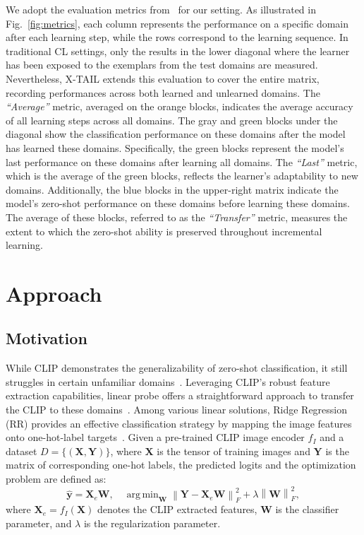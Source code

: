 \documentclass{article}
\DeclareMathOperator*{\argmin}{arg\,min}
\begin{document}
We adopt the evaluation metrics from~\cite{Zheng_2023_ICCV} for our setting. 
As illustrated in Fig.~\ref{fig:metrics}, each column represents the performance on a specific domain after each learning step, while the rows correspond to the learning sequence. 
In traditional CL settings, only the results in the lower diagonal where the learner has been exposed to the exemplars from the test domains are measured. Nevertheless, X-TAIL extends this evaluation to cover the entire matrix, recording performances across both learned and unlearned domains. The \emph{``Average''} metric, averaged on the orange blocks, indicates the average accuracy of all learning steps across all domains. The gray and green blocks under the diagonal show the classification performance on these domains after the model has learned these domains. Specifically, the green blocks represent the model's last performance on these domains after learning all domains. The \emph{``Last''} metric, which is the average of the green blocks, reflects the learner's adaptability to new domains. Additionally, the blue blocks in the upper-right matrix indicate the model's zero-shot performance on these domains before learning these domains. The average of these blocks, referred to as the \emph{``Transfer''} metric, measures the extent to which the zero-shot ability is preserved throughout incremental learning.


\section{Approach}
\label{sec:approach}
\subsection{Motivation}
\label{sec:motivations}
While CLIP demonstrates the generalizability of zero-shot classification, it still struggles in certain unfamiliar domains~\cite{gao2024clip}. Leveraging CLIP's robust feature extraction capabilities, linear probe offers a straightforward approach to transfer the CLIP to these domains~\cite{radford2021learning}. Among various linear solutions, Ridge Regression (RR) provides an effective classification strategy by mapping the image features onto one-hot-label targets~\cite{toh2008between}. Given a pre-trained CLIP image encoder $f_I$ and a dataset $D = \{(\mathbf{X}, \mathbf{Y})\}$, where $\mathbf{X}$ is the tensor of training images and  $\mathbf{Y}$ is the matrix of corresponding one-hot labels, the predicted logits and the optimization problem are defined as:
\begin{equation}
\hat{\mathbf{y}} = \mathbf{X}_e\mathbf{W}, \quad \argmin_{\mathbf{W}} \left\| \mathbf{Y} - \mathbf{X}_e\mathbf{W} \right\|_{F}^{2} + \lambda \left\| \mathbf{W} \right\|_{F}^{2},
\end{equation}
where $\mathbf{X}_e = f_I\left(\mathbf{X}\right)$ denotes the CLIP extracted features, $\mathbf{W}$ is the classifier parameter, and $\lambda$ is the regularization parameter.
\end{document}
